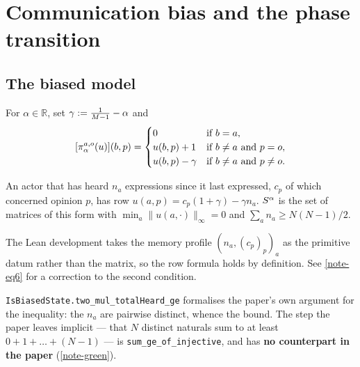 \chapter{Communication bias and the phase transition}

\section{The biased model}

\begin{definition}
  \label{eq5}
  \leanok
  For $\alpha \in \mathbb{R}$, set $\gamma := \tfrac{1}{M-1} - \alpha$ and
  \[
    [\pi_\alpha^{a,o}(u)](b,p) =
    \begin{cases}
      0 & \text{if } b = a, \\
      u(b,p) + 1 & \text{if } b \ne a \text{ and } p = o, \\
      u(b,p) - \gamma & \text{if } b \ne a \text{ and } p \ne o.
    \end{cases}
  \]
\end{definition}

\begin{definition}
  \label{eq6}
  \leanok
  An actor that has heard $n_a$ expressions since it last expressed, $c_p$ of
  which concerned opinion $p$, has row $u(a,p) = c_p(1+\gamma) - \gamma n_a$.
  $S^\alpha$ is the set of matrices of this form with
  $\min_a \|u(a,\cdot)\|_\infty = 0$ and $\sum_a n_a \ge N(N-1)/2$.

  The Lean development takes the memory profile $(n_a, (c_p)_p)_a$ as the
  primitive datum rather than the matrix, so the row formula holds by
  definition.  See \ref{note-eq6} for a correction to the second condition.

  \texttt{IsBiasedState.two\_mul\_totalHeard\_ge} formalises the paper's own
  argument for the inequality: the $n_a$ are pairwise distinct, whence the
  bound.  The step the paper leaves implicit --- that $N$ distinct naturals sum
  to at least $0 + 1 + \dots + (N-1)$ --- is \texttt{sum\_ge\_of\_injective},
  and has \textbf{no counterpart in the paper} (\ref{note-green}).
\end{definition}

